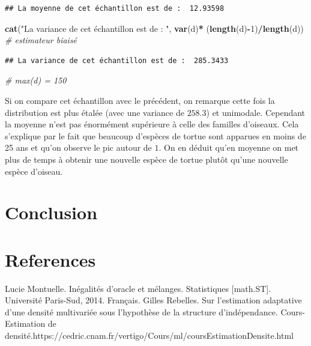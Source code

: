\documentclass[
]{book}
\newenvironment{Shaded}{\begin{snugshade}}{\end{snugshade}}
\newcommand{\CommentTok}[1]{\textcolor[rgb]{0.56,0.35,0.01}{\textit{#1}}}
\newcommand{\DecValTok}[1]{\textcolor[rgb]{0.00,0.00,0.81}{#1}}
\newcommand{\KeywordTok}[1]{\textcolor[rgb]{0.13,0.29,0.53}{\textbf{#1}}}
\newcommand{\NormalTok}[1]{#1}
\newcommand{\OperatorTok}[1]{\textcolor[rgb]{0.81,0.36,0.00}{\textbf{#1}}}
\newcommand{\StringTok}[1]{\textcolor[rgb]{0.31,0.60,0.02}{#1}}
\begin{document}
\begin{verbatim}
## La moyenne de cet échantillon est de :  12.93598
\end{verbatim}

\begin{Shaded}
\begin{Highlighting}[]
\KeywordTok{cat}\NormalTok{(}\StringTok{"La variance de cet échantillon est de : "}\NormalTok{, }\KeywordTok{var}\NormalTok{(d)}\OperatorTok{*}\StringTok{ }\NormalTok{(}\KeywordTok{length}\NormalTok{(d)}\OperatorTok{-}\DecValTok{1}\NormalTok{)}\OperatorTok{/}\KeywordTok{length}\NormalTok{(d)) }\CommentTok{# estimateur biaisé}
\end{Highlighting}
\end{Shaded}

\begin{verbatim}
## La variance de cet échantillon est de :  285.3433
\end{verbatim}

\begin{Shaded}
\begin{Highlighting}[]
\CommentTok{# max(d) = 150}
\end{Highlighting}
\end{Shaded}

Si on compare cet échantillon avec le précédent, on remarque cette fois la distribution est plus étalée (avec une variance de \(258.3\)) et unimodale. Cependant la moyenne n'est pas énormément supérieure à celle des familles d'oiseaux. Cela s'explique par le fait que beaucoup d'espèces de tortue sont apparues en moins de 25 ans et qu'on observe le pic autour de \(1\).
On en déduit qu'en moyenne on met plus de temps à obtenir une nouvelle espèce de tortue plutôt qu'une nouvelle espèce d'oiseau.

\hypertarget{conclusion}{%
\chapter{Conclusion}\label{conclusion}}

\hypertarget{references}{%
\chapter{References}\label{references}}

\label{eq:oracle} Lucie Montuelle. Inégalités d'oracle et mélanges. Statistiques {[}math.ST{]}. Université Paris-Sud, 2014.
Français.\newline
\label{eq:est-ad} Gilles Rebelles. Sur l'estimation adaptative d'une densité multivariée sous l'hypothèse de la structure d'indépendance.\newline
\label{eq:cours-est} Cours-Estimation de densité.https://cedric.cnam.fr/vertigo/Cours/ml/coursEstimationDensite.html\newline

  
\end{document}
